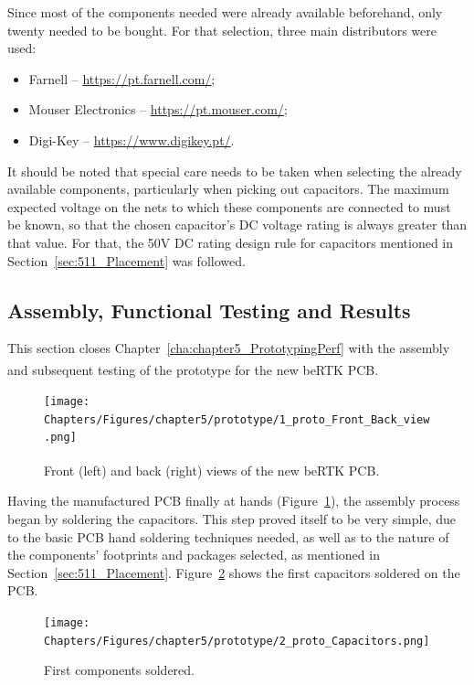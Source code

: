 Since most of the components needed were already available beforehand, only twenty needed to be bought. For that selection, three main distributors were used:
\begin{itemize}
	\item Farnell -- \url{https://pt.farnell.com/};
	\item Mouser Electronics -- \url{https://pt.mouser.com/};
	\item Digi-Key -- \url{https://www.digikey.pt/}.
\end{itemize}

It should be noted that special care needs to be taken when selecting the already available components, particularly when picking out capacitors. The maximum expected voltage on the nets to which these components are connected to must be known, so that the chosen capacitor's DC voltage rating is always greater than that value. For that, the 50V DC rating design rule for capacitors mentioned in Section~\ref{sec:511_Placement} was followed.


\subsection{Assembly, Functional Testing and Results}\label{sec:533_PrototypeAssembly}

This section closes Chapter~\ref{cha:chapter5_PrototypingPerf} with the assembly and subsequent testing of the prototype for the new beRTK\textsuperscript{\textregistered} PCB.

\begin{figure}[h]
	\centering
	\texttt{[image: Chapters/Figures/chapter5/prototype/1\_proto\_Front\_Back\_view.png]}
	\caption{Front (left) and back (right) views of the new beRTK\textsuperscript{\textregistered} PCB.}
	\label{fig:1_proto_Front_Back_view}
\end{figure}%

Having the manufactured PCB finally at hands (Figure~\ref{fig:1_proto_Front_Back_view}), the assembly process began by soldering the capacitors. This step proved itself to be very simple, due to the basic PCB hand soldering techniques needed, as well as to the nature of the components' footprints and packages selected, as mentioned in Section~\ref{sec:511_Placement}. Figure~\ref{fig:2_proto_Capacitors} shows the first capacitors soldered on the PCB.

\begin{figure}[h]
	\centering
	\texttt{[image: Chapters/Figures/chapter5/prototype/2\_proto\_Capacitors.png]}
	\caption{First components soldered.}
	\label{fig:2_proto_Capacitors}
\end{figure}%

